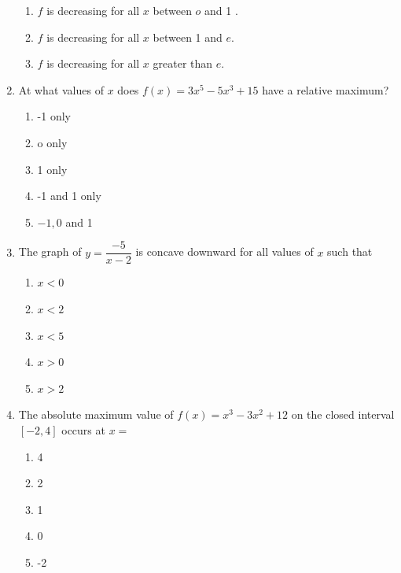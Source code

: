 \documentclass{article}
\begin{document}
\begin{enumerate}
\begin{minipage}[t]{\linewidth}
\begin{enumerate}
			\item \(f\) is decreasing for all \(x\) between \(o\) and 1 .
			\item \(f\) is decreasing for all \(x\) between 1 and \(e\).
			\item \(f\) is decreasing for all \(x\) greater than \(e\).
		\end{enumerate}
	\end{minipage}
	\item
	\begin{minipage}[t]{\linewidth}
		At what values of \(x\) does \(f(x)=3 x^{5}-5 x^{3}+15\) have a relative
maximum?
\vspace{1em}
		\begin{enumerate}
		\itemsep1em
			\item -1 only
			\item o only
			\item 1 only
			\item -1 and 1 only
			\item \(-1,0\) and 1
		\end{enumerate}
	\end{minipage}
	\item
	\begin{minipage}[t]{\linewidth}
		The graph of \(y=\dfrac{-5}{x-2}\) is concave downward for all values of
\(x\) such that
\vspace{1em}
		\begin{enumerate}
		\itemsep1em
			\item \(x<0\)
			\item \(x<2\)
			\item \(x<5\)
			\item \(x>0\)
			\item \(x>2\)
		\end{enumerate}
	\end{minipage}
	\item
	\begin{minipage}[t]{\linewidth}
		The absolute maximum value of \(f(x)=x^{3}-3 x^{2}+12\) on the closed
interval \([-2,4]\) occurs at \(x=\)
\vspace{1em}
		\begin{enumerate}
		\itemsep1em
			\item 4
			\item 2
			\item 1
			\item 0
			\item -2
		\end{enumerate}
	\end{minipage}

\end{enumerate}
\end{document}
